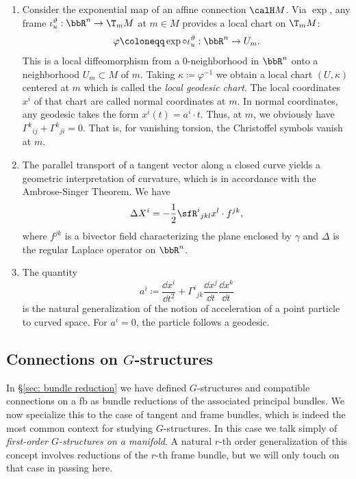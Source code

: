 \begin{rem}\label{rem 2.1.30 RS2}
    \begin{enumerate}
        \item Consider the exponential map of an affine connection $\calH M$. Via $\exp$, any frame $\iota_u^\vartheta:\bbR^n\to \T_m M$ at $m\in M$ provides a local chart on $\T_mM$:
        \[\varphi\coloneqq \exp\circ \iota_u^\vartheta:\bbR^n\to U_m.\]
        This is a local diffeomorphism from a $0$-neighborhood in $\bbR^n$ onto a  neighborhood $U_m\subset M$ of $m$. Taking $\kappa\coloneqq \varphi^{-1}$ we obtain a local chart $(U,\kappa)$ centered at $m$ which is called the \emph{local geodesic chart}. The local coordinates $x^i$ of that chart are called normal coordinates at $m$. In normal coordinates, any geodesic takes the form $x^i(t)=a^i\cdot t$. Thus, at $m$, we obviously have $\Gamma^k{}_{ij}+\Gamma^k{}_{ji}=0$. That is, for vanishing torsion, the Christoffel symbols vanish at $m$.
        \item The parallel transport of a tangent vector along a closed curve yields a geometric interpretation of curvature, which is in accordance with the Ambrose-Singer Theorem. We have 
        \[\Delta X^i=-\frac12 \sfR^i{}_{jkl}x^l\cdot f^{jk},\]
        where $f^{jk}$ is a bivector field characterizing the plane enclosed by $\gamma$ and $\Delta$ is the regular Laplace operator on $\bbR^n$.
        \item The quantity 
        \[a^i\coloneqq \frac{\dd x^i}{\dd t^2}+\Gamma^i{}_{jk}\frac{\dd x^j}{\dd t}\frac{\dd x^k}{\dd t}\]
        is the natural generalization of the notion of acceleration of a point particle to curved space. For $a^i=0$, the particle follows a geodesic.
    \end{enumerate}
\end{rem}





\subsection{Connections on \texorpdfstring{$G$}{G}-structures}

In \S\ref{sec: bundle reduction} we have defined $G$-structures and compatible connections on a \gls{fb} as bundle reductions of the associated principal bundles. We now specialize this to the case of tangent and frame bundles, which is indeed the most common context for studying $G$-structures. In this case we talk simply of \emph{first-order $G$-structures on a manifold}. A natural $r$-th order generalization of this concept involves reductions of the $r$-th frame bundle, but we will only touch on that case in passing here.

